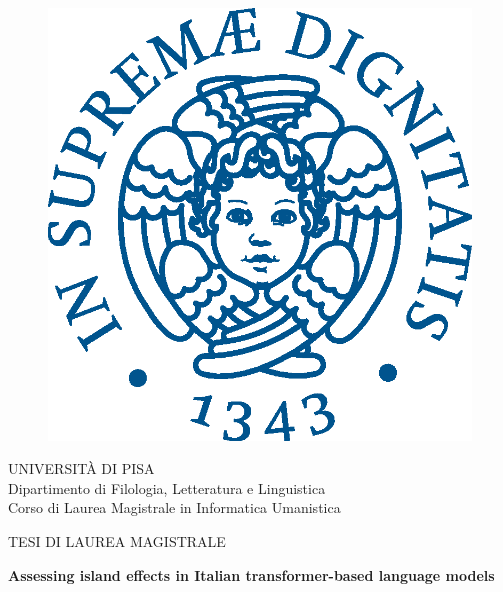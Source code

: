\begin{titlepage}
\begin{figure}[!htb]
    \centering
    \includegraphics[keepaspectratio=true,scale=0.5]{images/Frontespizio/cherubinFrontespizio.eps}
\end{figure}

\begin{center}
    \LARGE{UNIVERSITÀ DI PISA}
    \vspace{5mm}
    \\ \large{Dipartimento di Filologia, Letteratura e Linguistica}
    \vspace{5mm}
    \\ \LARGE{Corso di Laurea Magistrale in Informatica Umanistica}
\end{center}

\vspace{15mm}
\begin{center}
    {\large{TESI DI LAUREA MAGISTRALE}}\\
\end{center}
\begin{center}
    {\LARGE{\bf Assessing island effects in Italian transformer-based language models }}
    
    

\end{center}
\end{titlepage}
